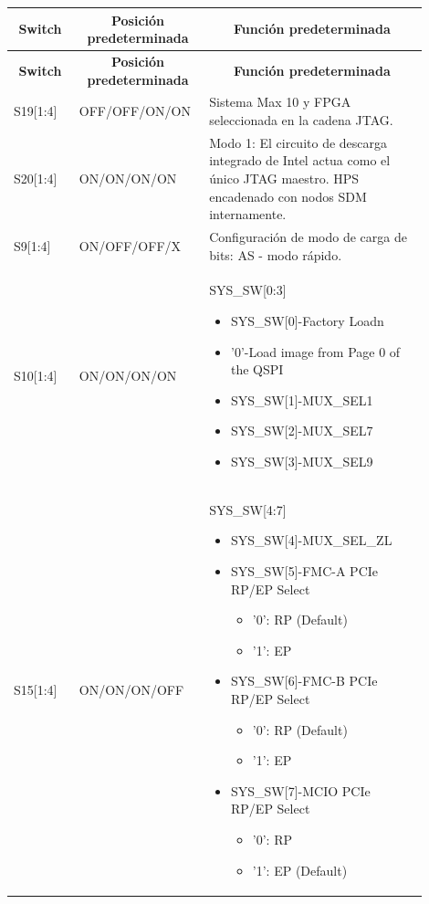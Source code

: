   \begin{longtable}{p{0.15\linewidth}|p{0.25\linewidth}|p{0.5\linewidth}} 
            \toprule
             \multicolumn{1}{c}{\textbf{Switch}}&\multicolumn{1}{c}{\textbf{Posici\'on predeterminada}}&\multicolumn{1}{c}{\textbf{Funci\'on predeterminada}}\\ 
             \toprule
             \endfirsthead

            \toprule
             \multicolumn{1}{c}{\textbf{Switch}}&\multicolumn{1}{c}{\textbf{Posici\'on predeterminada}}&\multicolumn{1}{c}{\textbf{Funci\'on predeterminada}}\\ 
             \toprule
             \endhead
             
             S19[1:4]&OFF/OFF/ON/ON& Sistema Max 10 y FPGA seleccionada en la cadena JTAG. \\\midrule
             S20[1:4]&ON/ON/ON/ON& Modo 1: El circuito de descarga integrado de Intel actua como el \'unico JTAG maestro. HPS encadenado con nodos SDM internamente.\\\midrule
             S9[1:4]&ON/OFF/OFF/X&\parbox[t]{\linewidth}{Configuraci\'on de modo de carga de bits: AS - modo r\'apido.}\\\midrule
             S10[1:4]&ON/ON/ON/ON&
             \parbox[t]{\linewidth}{SYS\_SW[0:3]
             \begin{itemize}
                 \item SYS\_SW[0]-Factory Loadn
\item '0'-Load image from Page 0 of the
QSPI
\item SYS\_SW[1]-MUX\_SEL1
\item SYS\_SW[2]-MUX\_SEL7
\item SYS\_SW[3]-MUX\_SEL9\end{itemize}}\\\midrule
             S15[1:4]&ON/ON/ON/OFF&\parbox[t]{\linewidth}{SYS\_SW[4:7]
             \begin{itemize}
                 \item SYS\_SW[4]-MUX\_SEL\_ZL
\item SYS\_SW[5]-FMC-A PCIe RP/EP
Select
\begin{itemize}
    \item '0': RP (Default)
\item '1': EP
\end{itemize}
\item SYS\_SW[6]-FMC-B PCIe RP/EP
Select
\begin{itemize}
    \item '0': RP (Default)
\item '1': EP
\end{itemize}
\item SYS\_SW[7]-MCIO PCIe RP/EP
Select
\begin{itemize}
    \item '0': RP
\item '1': EP (Default)
\end{itemize}
\end{itemize}}\\\midrule


\end{longtable}
